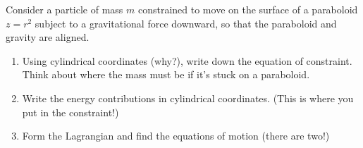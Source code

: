 \documentclass[letterpaper,10pt,english]{jupyterBook}
\begin{document}
\sphinxAtStartPar
Consider a particle of mass \(m\) constrained to move on the surface of a paraboloid \(z =  r^2\) subject to a gravitational force downward, so that the paraboloid and gravity are aligned.

\sphinxAtStartPar
{}
\begin{enumerate}
%
\item {} 
\sphinxAtStartPar
Using cylindrical coordinates (why?), write down the equation of constraint. Think about where the mass must be if it’s stuck on a paraboloid.

\item {} 
\sphinxAtStartPar
Write the energy contributions in cylindrical coordinates. (This is where you put in the constraint!)

\item {} 
\sphinxAtStartPar
Form the Lagrangian and find the equations of motion (there are two!)

\end{enumerate}
\end{document}
